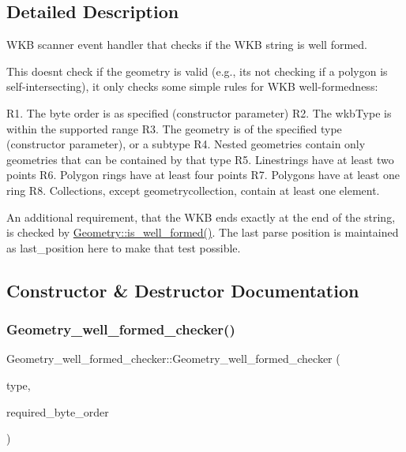 \subsection{Detailed Description}
W\+KB scanner event handler that checks if the W\+KB string is well formed.

This doesn\textquotesingle{}t check if the geometry is valid (e.\+g., it\textquotesingle{}s not checking if a polygon is self-\/intersecting), it only checks some simple rules for W\+KB well-\/formedness\+:

R1. The byte order is as specified (constructor parameter) R2. The wkb\+Type is within the supported range R3. The geometry is of the specified type (constructor parameter), or a subtype R4. Nested geometries contain only geometries that can be contained by that type R5. Linestrings have at least two points R6. Polygon rings have at least four points R7. Polygons have at least one ring R8. Collections, except geometrycollection, contain at least one element.

An additional requirement, that the W\+KB ends exactly at the end of the string, is checked by \mbox{\hyperlink{classGeometry_ae034f775d692619cc4bc8842d34a4cd8}{Geometry\+::is\+\_\+well\+\_\+formed()}}. The last parse position is maintained as last\+\_\+position here to make that test possible. 

\subsection{Constructor \& Destructor Documentation}
\mbox{\label{classGeometry__well__formed__checker_a86ee1f6dba50f392ae11b34e6e37f6fe}} 
\subsubsection{\texorpdfstring{Geometry\+\_\+well\+\_\+formed\+\_\+checker()}{Geometry\_well\_formed\_checker()}}
{\footnotesize\ttfamily Geometry\+\_\+well\+\_\+formed\+\_\+checker\+::\+Geometry\+\_\+well\+\_\+formed\+\_\+checker (\begin{DoxyParamCaption}\item[{Geometry\+::wkb\+Type}]{type,  }\item[{Geometry\+::wkb\+Byte\+Order}]{required\+\_\+byte\+\_\+order }\end{DoxyParamCaption})\hspace{0.3cm}{\ttfamily [inline]}}

